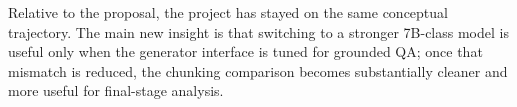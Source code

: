 \documentclass[11pt]{article}
\begin{document}
Relative to the proposal, the project has stayed on the same conceptual trajectory. The main new insight is that switching to a stronger 7B-class model is useful only when the generator interface is tuned for grounded QA; once that mismatch is reduced, the chunking comparison becomes substantially cleaner and more useful for final-stage analysis.



\end{document}
